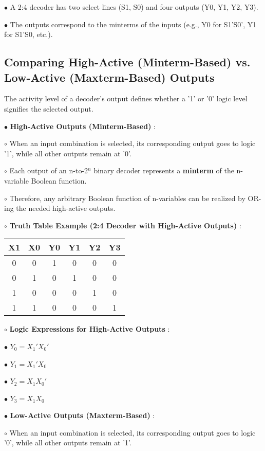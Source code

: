 \documentclass{article}
\begin{document}
$\bullet$ A 2:4 decoder has two select lines (S1, S0) and four outputs (Y0, Y1, Y2, Y3).

$\bullet$ The outputs correspond to the minterms of the inputs (e.g., Y0 for S1'S0', Y1 for S1'S0, etc.).

\subsection{Comparing High-Active (Minterm-Based) vs. Low-Active (Maxterm-Based) Outputs}

The activity level of a decoder's output defines whether a '1' or '0' logic level signifies the selected output.

$\bullet$ \textbf{High-Active Outputs (Minterm-Based)} :

    $\circ$ When an input combination is selected, its corresponding output goes to logic '1', while all other outputs remain at '0'.

    $\circ$ Each output of an n-to-2$^{n}$ binary decoder represents a \textbf{minterm} of the n-variable Boolean function.

    $\circ$ Therefore, any arbitrary Boolean function of n-variables can be realized by OR-ing the needed high-active outputs.

    $\circ$ \textbf{Truth Table Example (2:4 Decoder with High-Active Outputs)} : 
    \begin{tabular}{c c | c c c c}
    \toprule
     X1 & X0 & Y0 & Y1 & Y2 & Y3 \\
    \midrule
     0 & 0 & 1 & 0 & 0 & 0 \\
     0 & 1 & 0 & 1 & 0 & 0 \\
     1 & 0 & 0 & 0 & 1 & 0 \\
     1 & 1 & 0 & 0 & 0 & 1 \\
    \bottomrule
    
\end{tabular}


    $\circ$ \textbf{Logic Expressions for High-Active Outputs} :

        $\bullet$ $Y_0 = X_1' X_0'$

        $\bullet$ $Y_1 = X_1' X_0$

        $\bullet$ $Y_2 = X_1 X_0'$

        $\bullet$ $Y_3 = X_1 X_0$

$\bullet$ \textbf{Low-Active Outputs (Maxterm-Based)} :

    $\circ$ When an input combination is selected, its corresponding output goes to logic '0', while all other outputs remain at '1'.
\end{document}
